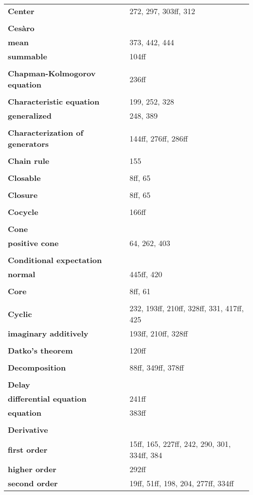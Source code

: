 \documentclass[9pt]{scrartcl}
\begin{document}
\begin{minipage}[t]{0.48\textwidth}
\begin{longtable}{>{\bfseries}p{4cm}p{3cm}}

\textbf{Center} & 272, 297, 303ff, 312 \\
\\
\textbf{Cesàro} & \\
\quad mean & 373, 442, 444 \\
\quad summable & 104ff \\
\\
\textbf{Chapman-Kolmogorov equation} & 236ff \\
\\
\textbf{Characteristic equation} & 199, 252, 328 \\
\quad generalized & 248, 389 \\
\\
\textbf{Characterization of generators} & 144ff, 276ff, 286ff \\
\\
\textbf{Chain rule} & 155 \\
\\
\textbf{Closable} & 8ff, 65 \\
\\
\textbf{Closure} & 8ff, 65 \\
\\
\textbf{Cocycle} & 166ff \\
\\
\textbf{Cone} & \\
\quad positive cone & 64, 262, 403 \\
\\
\textbf{Conditional expectation} & \\
\quad normal & 445ff, 420 \\
\\
\textbf{Core} & 8ff, 61 \\
\\
\textbf{Cyclic} & 232, 193ff, 210ff, 328ff, 331, 417ff, 425 \\
\quad imaginary additively & 193ff, 210ff, 328ff \\
\\
\textbf{Datko's theorem} & 120ff \\
\\
\textbf{Decomposition} & 88ff, 349ff, 378ff \\
\\
\textbf{Delay} & \\
\quad differential equation & 241ff \\
\quad equation & 383ff \\
\\
\textbf{Derivative} & \\
\quad first order & 15ff, 165, 227ff, 242, 290, 301, 334ff, 384 \\
\quad higher order & 292ff \\
\quad second order & 19ff, 51ff, 198, 204, 277ff, 334ff \\

\end{longtable}
\end{minipage}
\end{document}
